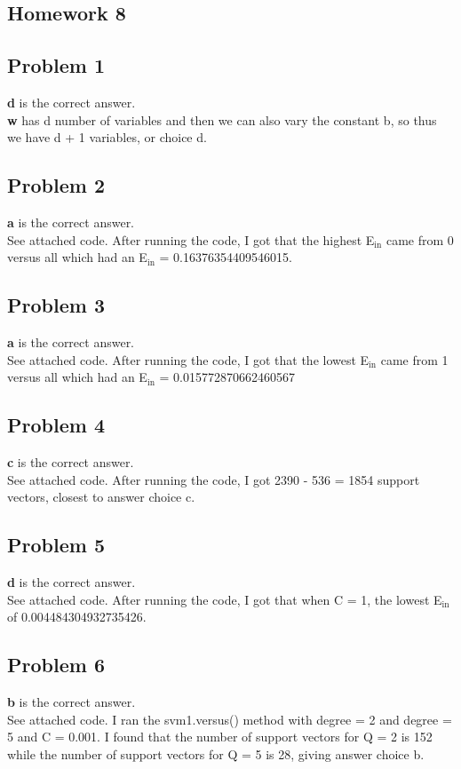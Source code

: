 \documentclass[12 pt]{article}
\begin{document}
	\begin{center}
		\section*{Homework 8}
	\end{center}
	
	
	\subsection*{Problem 1}	
	\textbf{d} is the correct answer. \\
	\textbf{w} has d number of variables and then we can also vary the constant b, so thus we have d + 1 variables, or choice d. 
	
	\subsection*{Problem 2}
	\textbf{a} is the correct answer. \\
	See attached code. After running the code, I got that the highest E$_{\text{in}}$ came from 0 versus all which had an E$_{\text{in}}$ = 0.16376354409546015.
	
	\subsection*{Problem 3}
	\textbf{a} is the correct answer.\\
	See attached code. After running the code, I got that the lowest E$_{\text{in}}$ came from 1 versus all which had an E$_{\text{in}}$ = 0.015772870662460567
	
	\subsection*{Problem 4}
	\textbf{c} is the correct answer.\\
	See attached code. After running the code, I got 2390 - 536 = 1854 support vectors, closest to answer choice c.

	\subsection*{Problem 5}
	\textbf{d} is the correct answer.\\
	See attached code. After running the code, I got that when C = 1, the lowest E$_{\text{in}}$ of 0.004484304932735426.
	
		
	\subsection*{Problem 6}
	\textbf{b} is the correct answer. \\
	See attached code. I ran the svm1.versus() method with degree = 2 and degree = 5 and C = 0.001. I found that the number of support vectors for Q = 2 is 152 while the number of support vectors for Q = 5 is 28, giving answer  choice b.
		
\end{document}

